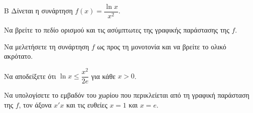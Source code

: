 \begin{thema}{Β}
Δίνεται η συνάρτηση $f(x) = \dfrac{\ln x}{x^2}$.
\begin{erwthma}
\item Να βρείτε το πεδίο ορισμού και τις ασύμπτωτες της γραφικής παράστασης της $f$.
\item Να μελετήσετε τη συνάρτηση $f$ ως προς τη μονοτονία και να βρείτε το ολικό ακρότατο.
\item Να αποδείξετε ότι $\ln{x} \le \dfrac{x^2}{2e}$ για κάθε $x > 0$.
\item Να υπολογίσετε το εμβαδόν του χωρίου που περικλείεται από τη γραφική παράσταση της $f$, τον άξονα $x'x$ και τις ευθείες $x=1$ και $x=e$.
\end{erwthma}
\end{thema}
